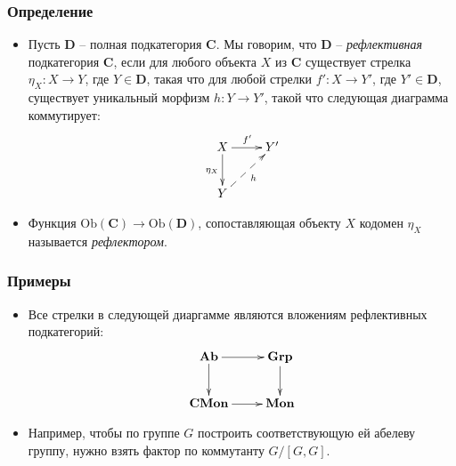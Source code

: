\documentclass{beamer}
\theoremstyle{definition}
\newcommand{\cat}[1]{\mathbf{#1}}
\renewcommand{\C}{\cat{C}}
\newcommand{\D}{\cat{D}}
\newcommand{\Grp}{\cat{Grp}}
\newcommand{\Mon}{\cat{Mon}}
\newcommand{\CMon}{\cat{CMon}}
\newcommand{\Ab}{\cat{Ab}}
\newcommand{\fs}[1]{\mathrm{#1}}
\newcommand{\Ob}{\fs{Ob}}
\begin{document}
\begin{frame}
\frametitle{Определение}
\begin{itemize}
\item Пусть $\D$ -- полная подкатегория $\C$.
Мы говорим, что $\D$ -- \emph{рефлективная} подкатегория $\C$, если для любого объекта $X$ из $\C$ существует стрелка $\eta_X : X \to Y$, где $Y \in \D$,
такая что для любой стрелки $f' : X \to Y'$, где $Y' \in \D$, существует уникальный морфизм $h : Y \to Y'$, такой что следующая диаграмма коммутирует:
\[ \xymatrix{ X \ar[d]_{\eta_X} \ar[r]^{f'} & Y' \\
              Y \ar@{-->}[ur]_h
            } \]
\item Функция $\Ob(\C) \to \Ob(\D)$, сопоставляющая объекту $X$ кодомен $\eta_X$ называется \emph{рефлектором}.
\end{itemize}
\end{frame}

\begin{frame}
\frametitle{Примеры}
\begin{itemize}
\item Все стрелки в следующей диаргамме являются вложениям рефлективных подкатегорий:
\[ \xymatrix{ \Ab \ar[r] \ar[d] & \Grp \ar[d] \\
              \CMon \ar[r]      & \Mon
            } \]
\item Например, чтобы по группе $G$ построить соответствующую ей абелеву группу, нужно взять фактор по коммутанту $G/[G,G]$.
\end{itemize}
\end{frame}
\end{document}
